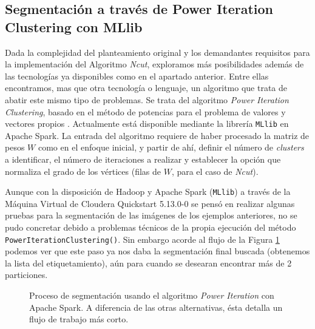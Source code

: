 \documentclass[conference]{IEEEtran}
\begin{document}
\subsection{Segmentación a través de Power Iteration Clustering con MLlib}

Dada la complejidad del planteamiento original y los demandantes requisitos para la implementación del Algoritmo \textit{Ncut}, exploramos más posibilidades además de las tecnologías ya disponibles como en el apartado anterior. Entre ellas encontramos, mas que otra tecnología o lenguaje, un algoritmo que trata de abatir este mismo tipo de problemas. Se trata del algoritmo \textit{Power Iteration Clustering}, basado en el método de potencias para el problema de valores y vectores propios \cite{PILin2010}. Actualmente está disponible mediante la librería \texttt{MLlib} en Apache Spark. La entrada del algoritmo requiere de haber procesado la matriz de pesos $W$ como en el enfoque inicial, y partir de ahí, definir el número de \textit{clusters} a identificar, el número de iteraciones a realizar y establecer la opción que normaliza el grado de los vértices (filas de $W$, para el caso de \textit{Ncut}).

\medskip

Aunque con la disposición de Hadoop y Apache Spark (\texttt{MLlib}) a través de la Máquina Virtual de Cloudera Quickstart 5.13.0-0 se pensó en realizar algunas pruebas para la segmentación de las imágenes de los ejemplos anteriores, no se pudo concretar debido a problemas técnicos de la propia ejecución del método \texttt{PowerIterationClustering()}. Sin embargo acorde al flujo de la Figura \ref{flowchart_pi1} podemos ver que este paso ya nos daba la segmentación final buscada (obtenemos la lista del etiquetamiento), aún para cuando se desearan encontrar más de 2 particiones.


\begin{figure}[htbp]
\caption{Proceso de segmentación usando el algoritmo \textit{Power Iteration} con Apache Spark. A diferencia de las otras alternativas, ésta detalla un flujo de trabajo más corto.}
\label{flowchart_pi1}
\end{figure}
\end{document}
